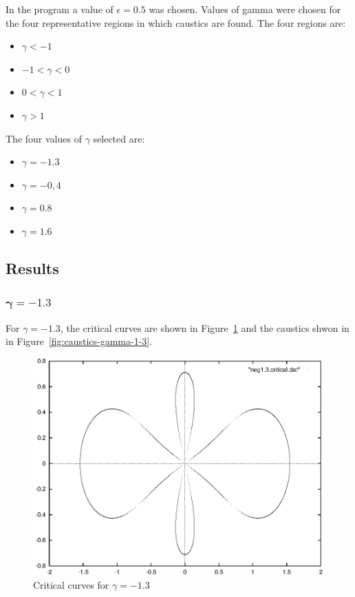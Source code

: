 \documentclass[a4paper]{IEEEtran}
\begin{document}
    In the program a value of $\epsilon = 0.5$ was chosen. Values
    of gamma were chosen for the four representative regions in which
    caustics are found. The four regions are:
    \begin{itemize}
        \item $\gamma < -1$
        \item $-1 < \gamma < 0$
        \item $0 < \gamma < 1$
        \item $\gamma > 1$
    \end{itemize}
    The four values of $\gamma$ selected are:
    \begin{itemize}
        \item $\gamma = -1.3$ 
        \item $\gamma = -0,4$
        \item $\gamma = 0.8$
        \item $\gamma = 1.6$
    \end{itemize}

    \subsection{Results}
   
    \subsubsection{$\mathbf{\gamma = -1.3}$}
     For $\gamma = -1.3$, the critical curves are shown in Figure~\ref{fig:critical-gamma-1-3}
    and the caustics shwon in in Figure~\ref{fig:caustics-gamma-1-3}.

    \begin{figure}
        \caption{Critical curves for $\gamma = -1.3$}
        \label{fig:critical-gamma-1-3} 
        \begin{center}
            \includegraphics[width=\columnwidth]{images/neg1-3-critical.eps} 
        \end{center}
    \end{figure}
\end{document}
